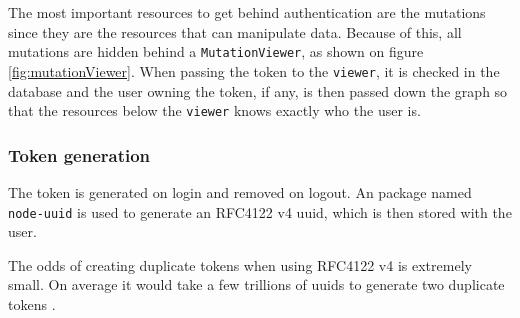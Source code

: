 The most important resources to get behind authentication are the mutations since they are the resources that can manipulate data. 
Because of this, all mutations are hidden behind a \verb+MutationViewer+, as shown on figure \ref{fig:mutationViewer}. 
When passing the token to the \verb+viewer+, it is checked in the database and the user owning the token, if any, is then passed down the graph so that the resources below the \verb+viewer+ knows exactly who the user is. 


\subsubsection{Token generation}
The token is generated on login and removed on logout. 
An  package named \verb+node-uuid+ is used to generate an RFC4122 v4 \gls{uuid}, which is then stored with the user. 

The odds of creating duplicate tokens when using RFC4122 v4 is extremely small. 
On average it would take a few trillions of \gls{uuid}s to generate two duplicate tokens \citep{authentication:uuid}.
